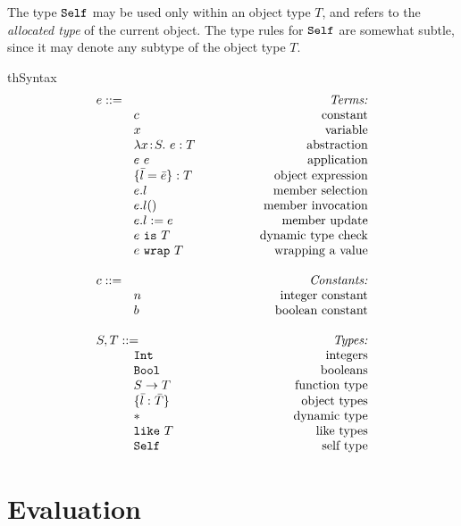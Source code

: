 \documentclass{article}
\newcommand{\mkrefl}[3]{\t{ref}^{#3}~{#1}~#2}
\newcommand{\derefl}[2]{!^{#2}{#1}}
\newcommand{\assignl}[3]{{#1}:=^{#3}{#2}}
\newcommand{\Ref}[1]{\t{Ref}~{#1}}
\newcommand{\lam}[4]{\lambda#1\!:\!#2.\,\,#4:#3}
\newcommand{\lamt}[2]{#1\rightarrow #2}
\newcommand{\app}[2]{#1~#2}
\newcommand{\Int}{\t{Int}}
\newcommand{\Bool}{\t{Bool}}
\newcommand{\dynamic}{\t{*}}
\newcommand{\true}{\t{true}}
\newcommand{\false}{\t{false}}
\newcommand{\lett}[4]{\t{letXXX}~{#1}:{#2}={#3}~\t{in}~{#4}}
\newcommand{\cast}[2]{#1~\t{is}~#2}
\renewcommand{\t}[1]{{\tt #1}}
\newcommand{\objty}[1]{\{#1\}}
\newcommand{\obje}[2]{\{#1\}:{#2}}
\newcommand{\objget}[2]{#1.#2}
\newcommand{\objcall}[2]{#1.#2()}
\newcommand{\objset}[3]{#1.#2:=#3}
\newcommand{\wrapty}[1]{\t{XXXX wrap}~#1}
\newcommand{\likety}[1]{\t{like}~#1}
\newcommand{\wrap}[2]{#1~\t{wrap}~#2}
\newcommand{\self}{\t{Self}}
\begin{document}
The type ${\self}$ may be used only within an object type $T$, and refers to the \emph{allocated type} of the current object.
The type rules for $\self$ are somewhat subtle, since
it may denote any subtype of the object type $T$.

\begin{displayfigure}{th}{\label{fig:syntax}Syntax}
\[
\begin{array}{llr}
	\mydefhead{e ::=\qquad\qquad\qquad\qquad\qquad}{Terms:} 
	\mydefcase{c								}{constant} 
	\mydefcase{x								}{variable} 
	\mydefcase{\lam{x}{S}{T}{e} 				}{abstraction} 
	\mydefcase{\app{e}{e} 					}{application} 
	\mydefcase{\obje{\bar{l}=\bar{e}}{T}		}{object expression}
	\mydefcase{\objget{e}{l}					}{member selection}
	\mydefcase{\objcall{e}{l}				}{member invocation}
	\mydefcase{\objset{e}{l}{e}				}{member update}
	\mydefcase{\cast{e}{T}					}{dynamic type check}
	\mydefcase{\wrap{e}{T}					}{wrapping a value}
\\
	\mydefhead{c ::=}{Constants:} 
	\mydefcase{n								}{integer constant} 
	\mydefcase{b								}{boolean constant} 
\\
	\mydefhead{S,T::=}{Types:} 
	\mydefcase{\Int 							}{integers}
	\mydefcase{\Bool							}{booleans}
	\mydefcase{\lamt{S}{T} 					}{function type}
	\mydefcase{\objty{\bar{l}:\bar{T}}	   	}{object types}
	\mydefcase{\dynamic 		    				}{dynamic type}
	\mydefcase{\likety{T}					}{like types}
	\mydefcase{\self							}{self type}
	
\end{array}
\]
\end{displayfigure}


\clearpage
\section{Evaluation}
\end{document}
